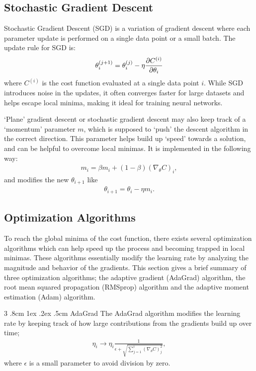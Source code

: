 \documentclass[%
reprint,s
amsmath,amssymb,
aps,
]{revtex4-2}
\makeatletter
\renewcommand{\subsubsection}{%
	\@startsection
	{subsubsection}%
	{3}%
	{\z@}%
	{.8cm \@plus1ex \@minus .2ex}%
	{.5cm}%
	{\normalfont\small\centering}%
}
\makeatother
\begin{document}
\subsection{Stochastic Gradient Descent} \label{sec:stochastic_gradient_descent}
Stochastic Gradient Descent (SGD) is a variation of gradient descent where each parameter update is performed on a single data point or a small batch. The update rule for SGD is:
\[
\theta_i^{(j+1)} = \theta_i^{(j)} - \eta \pdv{C^{(i)}}{\theta_i}
\]
where $C^{(i)}$ is the cost function evaluated at a single data point $i$. While SGD introduces noise in the updates, it often converges faster for large datasets and helps escape local minima, making it ideal for training neural networks.

`Plane' gradient descent or stochastic gradient descent may also keep track of a `momentum' parameter \(m\), which is supposed to `push' the descent algorithm in the correct direction. This parameter helps build up `speed' towards a solution, and can be helpful to overcome local minimas. It is implemented in the following way:
\begin{align}
	m_i = \beta m_i + (1-\beta)(\nabla_{\theta}C)_i,
\end{align}
and modifies the new \(\theta_{i+1}\) like 
\begin{align}
	\theta_{i+1} = \theta_{i} - \eta m_i.
\end{align}


\subsection{Optimization Algorithms} \label{sec:optimization_algorithms}
To reach the global minima of the cost function, there exists several optimization algorithms which can help speed up the process and becoming trapped in local minimas. These algorithms essentially modify the learning rate by analyzing the magnitude and behavior of the gradients. This section gives a brief summary of three optimization algorithms; the adaptive gradient (AdaGrad) algorithm, the root mean squared propagation (RMSprop) algorithm and the adaptive moment estimation (Adam) algorithm. 


\subsubsection{AdaGrad}
The AdaGrad algorithm modifies the learning rate by keeping track of how large contributions from the gradients build up over time;
\begin{align}
	\eta_i \rightarrow \eta_i \frac{1}{\epsilon + \sqrt{\sum_{j=1}^{i}(\nabla_{\theta}C)_{j}^{2}}},
\end{align}
where \(\epsilon\) is a small parameter to avoid division by zero.
\end{document}
